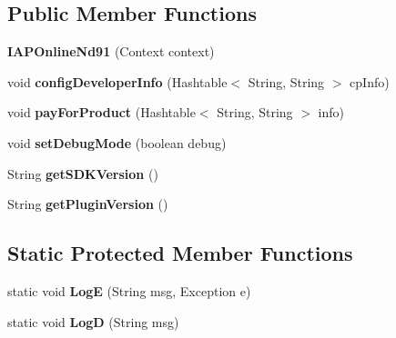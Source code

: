 \subsection*{Public Member Functions}
\begin{DoxyCompactItemize}
\item 
\mbox{\label{classorg_1_1cocos2dx_1_1plugin_1_1IAPOnlineNd91_a701579bc3fc354fbe635d9461f27f987}} 
{\bfseries I\+A\+P\+Online\+Nd91} (Context context)
\item 
\mbox{\label{classorg_1_1cocos2dx_1_1plugin_1_1IAPOnlineNd91_ab0e98e53fa832081a358d900257c8bcc}} 
void {\bfseries config\+Developer\+Info} (Hashtable$<$ String, String $>$ cp\+Info)
\item 
\mbox{\label{classorg_1_1cocos2dx_1_1plugin_1_1IAPOnlineNd91_a58204fb47e632d2d34d1ca8d390f74ea}} 
void {\bfseries pay\+For\+Product} (Hashtable$<$ String, String $>$ info)
\item 
\mbox{\label{classorg_1_1cocos2dx_1_1plugin_1_1IAPOnlineNd91_a1e44688049fc3fae74e54b871923ea99}} 
void {\bfseries set\+Debug\+Mode} (boolean debug)
\item 
\mbox{\label{classorg_1_1cocos2dx_1_1plugin_1_1IAPOnlineNd91_a9024b907719da4e62d511bd226a3fe8e}} 
String {\bfseries get\+S\+D\+K\+Version} ()
\item 
\mbox{\label{classorg_1_1cocos2dx_1_1plugin_1_1IAPOnlineNd91_a28604c30f22f571f686b0a7060b79981}} 
String {\bfseries get\+Plugin\+Version} ()
\end{DoxyCompactItemize}
\subsection*{Static Protected Member Functions}
\begin{DoxyCompactItemize}
\item 
\mbox{\label{classorg_1_1cocos2dx_1_1plugin_1_1IAPOnlineNd91_a57afbce520f963e2777819aafe30d6b3}} 
static void {\bfseries LogE} (String msg, Exception e)
\item 
\mbox{\label{classorg_1_1cocos2dx_1_1plugin_1_1IAPOnlineNd91_a601b00fd20eba0744e9449e55396614e}} 
static void {\bfseries LogD} (String msg)
\end{DoxyCompactItemize}
